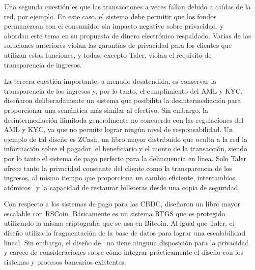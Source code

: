 \documentclass[a4paper,10pt]{article} %
\begin{document}
Una segunda cuestión es que las transacciones a veces fallan debido a
caídas de la red, por ejemplo. En este caso, el sistema debe permitir
que los fondos permanezcan con el consumidor sin impacto negativo sobre
privacidad. \citet{Camenisch2007} y~\citet{Dold} abordan este tema en
su propuesta de dinero electrónico respaldado. Varias de las soluciones
anteriores violan las garantías de privacidad para los clientes que
utilizan estas funciones, y todas, excepto Taler, violan el requisito de
transparencia de ingresos.

La tercera cuestión importante, a menudo desatendida, es conservar la
transparencia de los ingresos y, por lo tanto, el cumplimiento del AML y
KYC. \citet{Fuchsbauer} diseñaron deliberadamente un sistema que
posibilita la desintermediación para proporcionar una semántica más
similar al efectivo. Sin embargo, la desintermediación ilimitada
generalmente no concuerda con las regulaciones del AML y KYC, ya que no
permite lograr ningún nivel de responsabilidad. Un ejemplo de tal diseño
es ZCash, un libro mayor distribuido que oculta a la red la información
sobre el pagador, el beneficiario y el monto de la transacción, siendo
por lo tanto el sistema de pago perfecto para la delincuencia en línea.
Solo Taler ofrece tanto la privacidad constante del cliente como la
transparencia de los ingresos, al mismo tiempo que proporciona un cambio
eficiente, intercambios atómicos~\cite[consulte][]{Camenisch2007} y la
capacidad de restaurar billeteras desde una copia de seguridad.

Con respecto a los sistemas de pago para las CBDC, \citet{Danezis} diseñaron
un libro mayor escalable con RSCoin. Básicamente es un sistema RTGS que es
protegido utilizando la misma criptografía que se usa en Bitcoin. Al igual que
Taler, el diseño utiliza la fragmentación de la base de datos para lograr una
escalabilidad lineal. Sin embargo, el diseño de~\citet{Danezis} no tiene
ninguna disposición para la privacidad y carece de consideraciones sobre cómo
integrar prácticamente el diseño con los sistemas y procesos bancarios
existentes.
\end{document}
